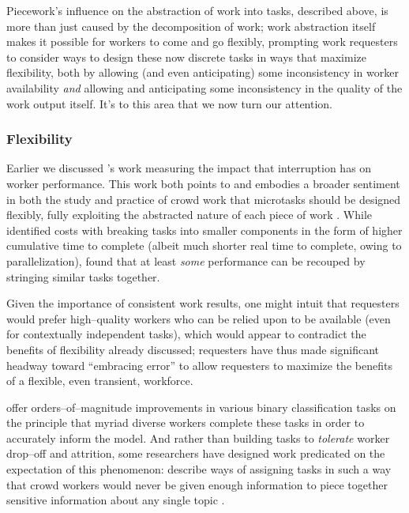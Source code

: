 \documentclass{sigchi}
\begin{document}
Piecework's influence on the abstraction of work into tasks,
described above, is more than just caused by the decomposition of work;
work abstraction itself makes it possible for workers to come and go flexibly,
prompting work requesters to consider ways to design these now discrete tasks in ways that
maximize flexibility, both by allowing (and even anticipating) some inconsistency in worker availability
\textit{and} allowing and anticipating some inconsistency in the quality of the work output itself.
It's to this area that we now turn our attention.

\subsubsection{Flexibility}\label{sec:flexibility}
Earlier we discussed \citeauthor{cheng2015break}'s work
measuring the impact that interruption has on worker performance.
This work both points to and embodies a broader sentiment in
both the study and practice
of crowd work that microtasks should be designed flexibly,
fully exploiting the abstracted nature of each piece of work
\cite{interruptionIqbal,delayAndOrderLasecki,vaish2014low}.
While \citeauthor{cheng2015break} identified costs with breaking tasks into smaller components
in the form of higher cumulative time to complete
(albeit much shorter real time to complete, owing to parallelization),
\citeauthor{delayAndOrderLasecki} found that at least \textit{some} performance can be recouped by stringing 
similar tasks together.


Given the importance of consistent work results, one might intuit that
requesters would prefer high--quality workers who can be relied upon to be available
(even for contextually independent tasks),
which would appear to contradict the benefits of flexibility already discussed;
requesters have thus made significant headway toward
``embracing error'' to allow requesters to maximize the benefits of a flexible,
even transient,
workforce.

\citeauthor{embracingErrorKrishna} offer orders--of--magnitude improvements
in various binary classification tasks
on the principle that myriad diverse workers complete these tasks
in order to accurately inform the model.
And rather than building tasks to \textit{tolerate} worker drop--off and attrition,
some researchers have designed work predicated on the expectation of this phenomenon:
\citeauthor{sensitiveTasks} describe ways of assigning tasks in such a way that
crowd workers would never be given enough information to piece together sensitive information about
any single topic
\cite{sensitiveTasks}.
\end{document}
